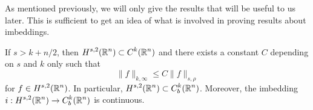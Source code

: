 As mentioned previously, we will only give the results that will be
useful to us later.  This is sufficient to get an idea of what is
involved in proving results about imbeddings.

\begin{theorem} \label{sob_TheSobLemma}
If $s >k +n/2$, then $\displaystyle H^{s,2}(\mathbb{R}^n) \subset C^k(\mathbb{R}^n)$ and there
exists a constant $C$ depending on $s$ and $k$ only such that
\begin{equation} \label{sob_sob_lemma_max}
\|f\|_{k,\infty} \leq C \|f\|_{s,\rho}
\end{equation}
for $\displaystyle f \in H^{s,2}(\mathbb{R}^n)$.
In particular, $\displaystyle H^{s,2}(\mathbb{R}^n) \subset C_b^k(\mathbb{R}^n)$.
Moreover, the imbedding $\displaystyle i:H^{s,2}(\mathbb{R}^n) \to C_b^k(\mathbb{R}^n)$
is continuous.  
\end{theorem}

